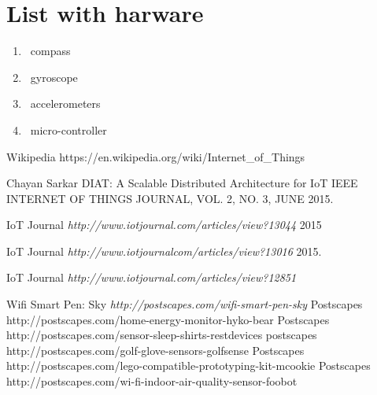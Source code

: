 \documentclass[12pt]{article}
\begin{document}
 \section {List with harware}

\begin{enumerate}
\item\ compass
\item\ gyroscope 
\item\ accelerometers
\item\ micro-controller

\end{enumerate}


\begin{thebibliography}{1}

  Wikipedia {https://en.wikipedia.org/wiki/Internet_of_Things}

  Chayan Sarkar {DIAT: A Scalable Distributed Architecture for IoT} IEEE INTERNET OF THINGS JOURNAL, VOL. 2, NO. 3, JUNE 2015.

   IoT Journal {\em http://www.iotjournal.com/articles/view?13044} 2015

    IoT Journal {\em http://www.iotjournalcom/articles/view?13016} 2015.

   IoT Journal {\em http://www.iotjournal.com/articles/view?12851} 

   Wifi Smart Pen: Sky {\em http://postscapes.com/wifi-smart-pen-sky} 
   Postscapes {http://postscapes.com/home-energy-monitor-hyko-bear}
   Postscapes {http://postscapes.com/sensor-sleep-shirts-restdevices}
 postscapes {http://postscapes.com/golf-glove-sensors-golfsense}
 Postscapes {http://postscapes.com/lego-compatible-prototyping-kit-mcookie}
 Postscapes {http://postscapes.com/wi-fi-indoor-air-quality-sensor-foobot}

  \end{thebibliography}
\end{document}
